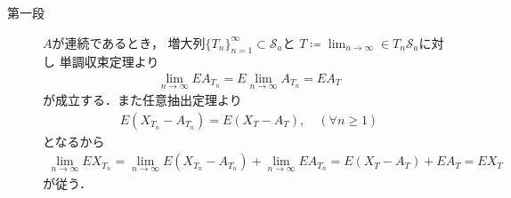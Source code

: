 	\begin{prf}\mbox{}
		\begin{description}
			\item[第一段] $A$が連続であるとき，
				増大列$\{T_n\}_{n=1}^\infty \subset \mathscr{S}_a$と
				$T \coloneqq \lim_{n \to \infty} \in T_n \mathscr{S}_a$に対し
				単調収束定理より
				\begin{align}
					\lim_{n \to \infty} EA_{T_n}
					= E \lim_{n \to \infty} A_{T_n}
					= EA_T
				\end{align}
				が成立する．また任意抽出定理より
				\begin{align}
					E(X_{T_n} - A_{T_n}) = E(X_{T} - A_{T}),
					\quad (\forall n \geq 1)
				\end{align}
				となるから
				\begin{align}
					\lim_{n \to \infty} EX_{T_n} 
					= \lim_{n \to \infty} E(X_{T_n} - A_{T_n}) + \lim_{n \to \infty} EA_{T_n} 
					= E(X_{T} - A_{T}) + EA_T
					= EX_T
				\end{align}
				が従う．
				

\end{description}
\end{prf}
